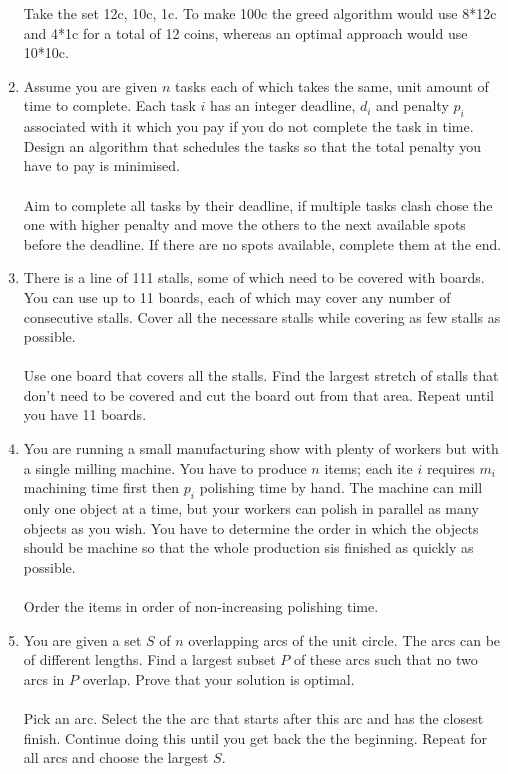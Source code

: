 \documentclass[a4paper]{article}
\begin{document}
\begin{enumerate}
				Take the set 12c, 10c, 1c. To make 100c the greed algorithm would use 8*12c and 4*1c for a total of 12 coins, whereas an optimal approach would use 10*10c.
		\item Assume you are given $n$ tasks each of which takes the same, unit amount of time to complete. Each task $i$ has an integer deadline, $d_i$ and penalty $p_i$ associated with it which you pay if you do not complete the task in time. Design an algorithm that schedules the tasks so that the total penalty you have to pay is minimised. \\ \\
				Aim to complete all tasks by their deadline, if multiple tasks clash chose the one with higher penalty and move the others to the next available spots before the deadline. If there are no spots available, complete them at the end.
		\item There is a line of 111 stalls, some of which need to be covered with boards. You can use up to 11 boards, each of which may cover any number of consecutive stalls. Cover all the necessare stalls while covering as few stalls as possible. \\ \\
				Use one board that covers all the stalls. Find the largest stretch of stalls that don't need to be covered and cut the board out from that area. Repeat until you have 11 boards.
		\item You are running a small manufacturing show with plenty of workers but with a single milling machine. You have to produce $n$ items; each ite $i$ requires $m_i$ machining time first then $p_i$ polishing time by hand. The machine can mill only one object at a time, but your workers can polish in parallel as many objects as you wish. You have to determine the order in which the objects should be machine so that the whole production sis finished as quickly as possible. \\ \\
				Order the items in order of non-increasing polishing time. 
		\item You are given a set $S$ of $n$ overlapping arcs of the unit circle. The arcs can be of different lengths. Find a largest subset $P$ of these arcs such that no two arcs in $P$ overlap. Prove that your solution is optimal. \\ \\
				Pick an arc. Select the the arc that starts after this arc and has the closest finish. Continue doing this until you get back the the beginning. Repeat for all arcs and choose the largest $S$.

\end{enumerate}
\end{document}
